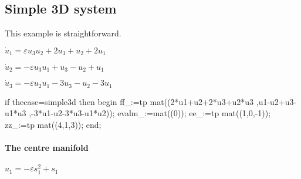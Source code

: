 \documentclass[11pt,a5paper]{article}
\begin{document}
%





\subsection{Simple 3D system}

This example is straightforward.

\begin{math}
\dot u_{1}=\varepsilon  u_{3} u_{2}+2 u_{3}+u_{2}+2 u_{1}
\end{math}\par

\begin{math}
\dot u_{2}=-\varepsilon  u_{3} u_{1}+u_{3}-u_{2}+u_{1}
\end{math}\par

\begin{math}
\dot u_{3}=-\varepsilon  u_{2} u_{1}-3 u_{3}-u_{2}-3 u_{1}
\end{math}

\begin{reduce}
if thecase=simple3d then begin
ff_:=tp mat((2*u1+u2+2*u3+u2*u3
  ,u1-u2+u3-u1*u3
  ,-3*u1-u2-3*u3-u1*u2));
evalm_:=mat((0));
ee_:=tp mat((1,0,-1));
zz_:=tp mat((4,1,3));
end;
\end{reduce}


\paragraph{The centre manifold} 

\begin{math}
u_{1}=-\varepsilon  s_{1}^{2}+s_{1}
\end{math}\par
\end{document}
